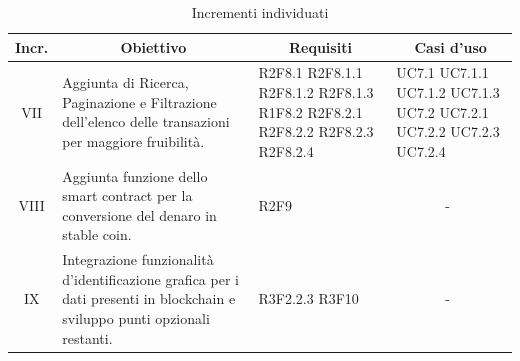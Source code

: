 \begin{table}[H]
  \centering
  \renewcommand{\arraystretch}{1.8}
  \begin{tabular}{c|p{6cm}|p{2cm}|p{2cm}}
    \rowcolor[HTML]{125E28}
    \color[HTML]{FFFFFF}\textbf{Incr.}
    & \multicolumn{1}{c}{\color[HTML]{FFFFFF}\textbf{Obiettivo}}
    & \multicolumn{1}{c}{\color[HTML]{FFFFFF}\textbf{Requisiti}}
    & \multicolumn{1}{c}{\color[HTML]{FFFFFF}\textbf{Casi d'uso}}\\
    \hline
    VII	& Aggiunta di Ricerca, Paginazione e Filtrazione dell'elenco delle transazioni per maggiore fruibilità. & R2F8.1 R2F8.1.1 R2F8.1.2 R2F8.1.3 R1F8.2 R2F8.2.1 R2F8.2.2 R2F8.2.3 R2F8.2.4 & UC7.1 UC7.1.1 UC7.1.2 UC7.1.3 UC7.2 UC7.2.1 UC7.2.2 UC7.2.3 UC7.2.4 \\
    VIII & Aggiunta funzione dello smart contract per la conversione del denaro in stable coin. & R2F9 & \ \ \ \ \ \ \ - \\
    IX & Integrazione funzionalità d'identificazione grafica per i dati presenti in blockchain\glo{} e sviluppo punti opzionali restanti. & R3F2.2.3 R3F10  & \ \ \ \ \ \ \ - \\
  \end{tabular}
  \caption{Incrementi individuati}
\end{table}